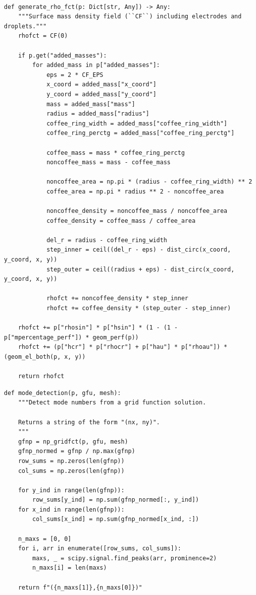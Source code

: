 \clearpage
\begin{verbatim}

def generate_rho_fct(p: Dict[str, Any]) -> Any:
    """Surface mass density field (``CF``) including electrodes and droplets."""
    rhofct = CF(0)

    if p.get("added_masses"):
        for added_mass in p["added_masses"]:
            eps = 2 * CF_EPS
            x_coord = added_mass["x_coord"]
            y_coord = added_mass["y_coord"]
            mass = added_mass["mass"]
            radius = added_mass["radius"]
            coffee_ring_width = added_mass["coffee_ring_width"]
            coffee_ring_perctg = added_mass["coffee_ring_perctg"]

            coffee_mass = mass * coffee_ring_perctg
            noncoffee_mass = mass - coffee_mass

            noncoffee_area = np.pi * (radius - coffee_ring_width) ** 2
            coffee_area = np.pi * radius ** 2 - noncoffee_area

            noncoffee_density = noncoffee_mass / noncoffee_area
            coffee_density = coffee_mass / coffee_area

            del_r = radius - coffee_ring_width
            step_inner = ceil((del_r - eps) - dist_circ(x_coord, y_coord, x, y))
            step_outer = ceil((radius + eps) - dist_circ(x_coord, y_coord, x, y))

            rhofct += noncoffee_density * step_inner
            rhofct += coffee_density * (step_outer - step_inner)

    rhofct += p["rhosin"] * p["hsin"] * (1 - (1 - p["mpercentage_perf"]) * geom_perf(p))
    rhofct += (p["hcr"] * p["rhocr"] + p["hau"] * p["rhoau"]) * (geom_el_both(p, x, y))

    return rhofct

\end{verbatim}
\clearpage
\begin{verbatim}
def mode_detection(p, gfu, mesh):
    """Detect mode numbers from a grid function solution.

    Returns a string of the form "(nx, ny)".
    """
    gfnp = np_gridfct(p, gfu, mesh)
    gfnp_normed = gfnp / np.max(gfnp)
    row_sums = np.zeros(len(gfnp))
    col_sums = np.zeros(len(gfnp))

    for y_ind in range(len(gfnp)):
        row_sums[y_ind] = np.sum(gfnp_normed[:, y_ind])
    for x_ind in range(len(gfnp)):
        col_sums[x_ind] = np.sum(gfnp_normed[x_ind, :])

    n_maxs = [0, 0]
    for i, arr in enumerate([row_sums, col_sums]):
        maxs, _ = scipy.signal.find_peaks(arr, prominence=2)
        n_maxs[i] = len(maxs)

    return f"({n_maxs[1]},{n_maxs[0]})"
\end{verbatim}
